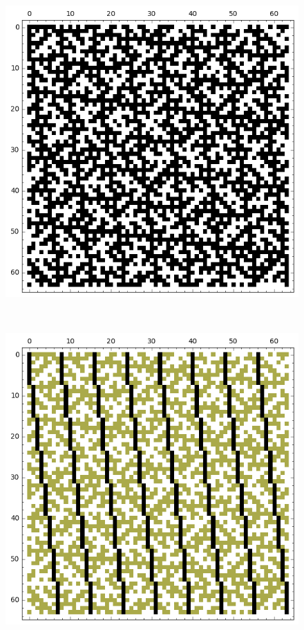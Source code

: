 \documentclass[12pt,a4paper]{article}
\begin{document}
\begin{figure}[!bhpt] %
\centering
\begin{minipage}{.48\textwidth}
  \centering
  \includegraphics[width=.9\linewidth]{../matrix_plot/re6_2_weight_class_matrix.png}
  \label{fig:6_2_weight_class_matrix}
\end{minipage}%
~~~~
\begin{minipage}{.48\textwidth}
  \centering
  \includegraphics[width=.9\linewidth]{../matrix_plot/re6_2_bent_cayley_graph_index_matrix.png}
  \label{fig:6_2_bent_cayley_graph_index_matrix}
\end{minipage}
\end{figure}
\end{document}
